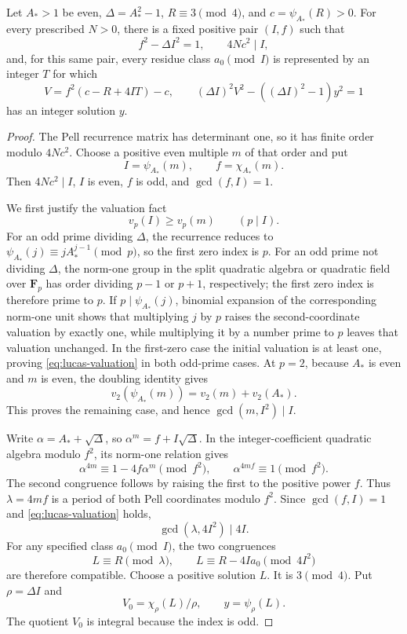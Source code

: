 \begin{lemma}\label{lem:interpolation}
Let $A_*>1$ be even, $\Delta=A_*^2-1$, $R\equiv3\pmod4$, and
$c=\psi_{A_*}(R)>0$. For every prescribed $N>0$, there is a fixed
positive pair $(I,f)$ such that
\[
 f^2-\Delta I^2=1,\qquad4Nc^2\mid I,
\]
and, for this same pair, every residue class $a_0\pmod I$ is represented
by an integer $T$ for which
\begin{equation}\label{eq:interpolation-equations}
 V=f^2(c-R+4IT)-c,\qquad
 (\Delta I)^2V^2-((\Delta I)^2-1)y^2=1
\end{equation}
has an integer solution $y$.
\end{lemma}
\begin{proof}
The Pell recurrence matrix has determinant one, so it has finite order
modulo $4Nc^2$. Choose a positive even multiple $m$ of that order and
put
\[
 I=\psi_{A_*}(m),\qquad f=\chi_{A_*}(m).
\]
Then $4Nc^2\mid I$, $I$ is even, $f$ is odd, and $\gcd(f,I)=1$.

We first justify the valuation fact
\begin{equation}\label{eq:lucas-valuation}
 v_p(I)\ge v_p(m)\qquad(p\mid I).
\end{equation}
For an odd prime dividing $\Delta$, the recurrence reduces to
$\psi_{A_*}(j)\equiv jA_*^{j-1}\pmod p$, so the first zero
index is $p$. For an odd prime not dividing $\Delta$, the norm-one
group in the split quadratic algebra or quadratic field over
$\mathbf F_p$ has order dividing $p-1$ or $p+1$, respectively; the
first zero index is therefore prime to $p$. If $p\mid\psi_{A_*}(j)$,
binomial expansion of the corresponding norm-one unit shows that
multiplying $j$ by $p$ raises the second-coordinate valuation by
exactly one, while multiplying it by a number prime to $p$ leaves
that valuation unchanged. In the first-zero case the initial valuation
is at least one, proving \eqref{eq:lucas-valuation} in both odd-prime
cases. At $p=2$, because $A_*$ is even and $m$ is even, the doubling
identity gives
\[
 v_2(\psi_{A_*}(m))=v_2(m)+v_2(A_*).
\]
This proves the remaining case, and hence $\gcd(m,I^2)\mid I$.

Write $\alpha=A_*+\sqrt\Delta$, so
$\alpha^m=f+I\sqrt\Delta$. In the integer-coefficient quadratic
algebra modulo $f^2$, its norm-one relation gives
\[
 \alpha^{4m}\equiv1-4f\alpha^m\pmod{f^2},
 \qquad \alpha^{4mf}\equiv1\pmod{f^2}.
\]
The second congruence follows by raising the first to the positive
power $f$. Thus $\lambda=4mf$ is a period of both Pell coordinates
modulo $f^2$. Since $\gcd(f,I)=1$ and
\eqref{eq:lucas-valuation} holds,
\[
 \gcd(\lambda,4I^2)\mid4I.
\]
For any specified class $a_0\pmod I$, the two congruences
\begin{equation}\label{eq:interpolation-crt}
 L\equiv R\pmod\lambda,\qquad
 L\equiv R-4Ia_0\pmod{4I^2}
\end{equation}
are therefore compatible. Choose a positive solution $L$. It is
$3\pmod4$. Put $\rho=\Delta I$ and
\[
 V_0=\chi_\rho(L)/\rho,\qquad y=\psi_\rho(L).
\]
The quotient $V_0$ is integral because the index is odd.


\end{proof}
